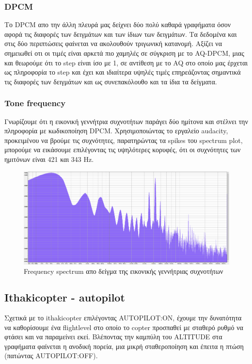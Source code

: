 \documentclass[hidelinks, 12pt, a4paper]{article}
\begin{document}
\subsubsection{DPCM}

Το DPCM απο την άλλη πλευρά μας δείχνει δύο πολύ καθαρά γραφήματα όσον αφορά τις διαφορές των δειγμάτων και των ίδιων των δειγμάτων. Τα δεδομένα και στις δύο περιπτώσεις φαίνεται να ακολουθούν τριγωνική κατανομή. Αξίζει να σημειωθεί οτι οι τιμές είναι αρκετά πιο χαμηλές σε σύγκριση με το AQ-DPCM, μιας και θεωρούμε ότι το step είναι ίσο με 1, σε αντίθεση με το AQ στο οποίο μας έρχεται ως πληροφορία το step και έχει και ιδιαίτερα υψηλές τιμές επηρεάζοντας σημαντικά τις διαφορές των δειγμάτων και ως συνεπακόλουθο και τα ίδια τα δείγματα.

\subsubsection{Tone frequency}

Γνωρίζουμε ότι η εικονική γεννήτρια συχνοτήτων παράγει δύο ημίτονα και στέλνει την πληροφορία με κωδικοποίηση DPCM. Χρησιμοποιώντας το εργαλείο audacity, προκειμένου να βρούμε τις συχνότητες, παρατηρώντας τα spikes του spectrum plot, μπορούμε να εικάσουμε επιλέγοντας τις υψηλότερες κορυφές, ότι οι συχνότητες των ημιτόνων είναι 421 και 343 Hz.

\begin{figure}[h!]
\centering
	\includegraphics[height=.3\textheight, width=\textwidth]{assets/session1/spectrum.png}
    \caption{Frequency spectrum απο δείγμα της εικονικής γεννήτριας συχνοτήτων}
\end{figure}


\subsection{Ithakicopter - autopilot}

Σχετικά με το ithakicopter επιλέγοντας AUTOPILOT:ON, έχουμε την δυνατότητα να καθορίσουμε ένα flightlevel στο οποίο το copter προσπαθεί με σταθερό ρυθμό να φτάσει και να παραμείνει εκεί. Βλέποντας την καμπύλη του ALTITUDE στα γραφήματα φαίνεται η ανοδική πορεία, μια μικρή σταθεροποίηση και έπειτα η πτώση (πατώντας AUTOPILOT:OFF). 
\end{document}
